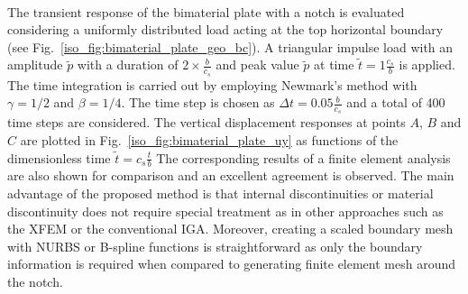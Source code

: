 \paragraph{}
The transient response of the bimaterial plate with a notch is evaluated considering a uniformly distributed load acting at the top horizontal boundary (see Fig.~\ref{iso_fig:bimaterial_plate_geo_bc}).
A triangular impulse load with an amplitude $\widetilde{p}$ with a duration of $2 \times \frac{b}{c_s}$ and peak value $\widetilde{p}$ at time $\widetilde{t}=1\frac{c_s}{b}$ is applied.
The time integration is carried out by employing Newmark's method with $\gamma = 1/2$ and $\beta = 1/4$.
The time step is chosen as $\Delta t = 0.05\frac{b}{c_s}$ and a total of 400 time steps are considered.
The vertical displacement responses at points $A$, $B$ and $C$ are plotted in Fig.~\ref{iso_fig:bimaterial_plate_uy} as functions of the dimensionless time $\widetilde{t} = c_s\frac{t}{b}$
The corresponding results of a finite element analysis are also shown for comparison and an excellent agreement is observed.
The main advantage of the proposed method is that internal discontinuities or material discontinuity does not require special treatment as in other approaches such as the XFEM or the conventional IGA.
Moreover, creating a scaled boundary mesh with NURBS or B-spline functions is straightforward as only the boundary information is required when compared to generating finite element mesh around the notch.
